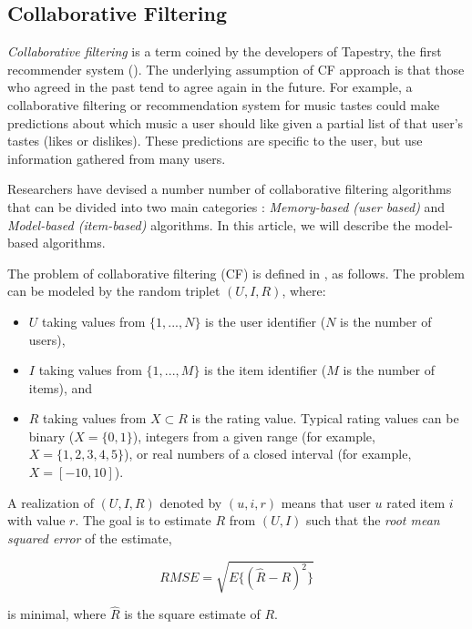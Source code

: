 \documentclass[10pt,a4paper]{article}  %
\begin{document}
\subsection{Collaborative Filtering}
\label{sec:cf}

\emph{Collaborative filtering} is a term coined by the developers of Tapestry, the first recommender system (\cite{Goldberg92usingcollaborative}). The underlying assumption of CF approach is that those who agreed in the past tend to agree again in the future. For example, a collaborative filtering or recommendation system for music tastes could make predictions about which music a user should like given a partial list of that user's tastes (likes or dislikes). These predictions are specific to the user, but use information gathered from many users. 

Researchers have devised a number number of collaborative filtering algorithms that can be divided into two main categories 
\cite{Sarwar01item-basedcollaborative}: \emph{Memory-based (user based)} and \emph{Model-based (item-based)} algorithms. In this article, we will describe the model-based algorithms.

The problem of collaborative filtering (CF) is defined in \cite{takacs09scalable}, as follows. The problem can be modeled by the random triplet $(U,I,R)$, where:
  \begin{itemize}
    \item $U$ taking values from $\{1,...,N\}$ is the user identifier ($N$ is the number of users),
    \item $I$ taking values from $\{1,...,M\}$ is the item identifier ($M$ is the number of items), and
    \item $R$ taking values from $X \subset R$ is the rating value. Typical rating values can be binary ($X = \{0,1\}$), integers from a given range (for example, $X = \{1,2,3,4,5\}$), or real numbers of a closed interval (for example, $X = [−10, 10]$).
  \end{itemize}

A realization of $(U,I,R)$ denoted by $(u,i,r)$ means that user $u$ rated item $i$ with value $r$. The goal is to estimate $R$ from $(U,I)$ such that the \emph{root mean squared error} of the estimate,

\begin{equation}
  \label{rmse_1}
  RMSE = \sqrt{E\{(\hat{R}-R)^2\}}
\end{equation}

is minimal, where $\hat{R}$ is the square estimate of $R$.
\end{document}
